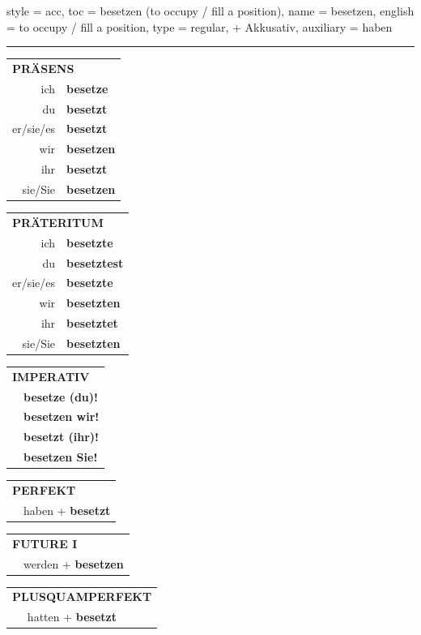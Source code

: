 \begin{verbentry}{
  style = {acc},
  toc = {besetzen (to occupy / fill a position)},
  name = {besetzen},
  english = {to occupy / fill a position},
  type = {regular, + Akkusativ},
  auxiliary = {haben}
}


\vspace{5pt}
\hrule
\vspace{5pt}

\begin{tabular}{rl}
\multicolumn{2}{l}{\textbf{PRÄSENS}}\\
ich & \textbf{besetze}\\
du & \textbf{besetzt}\\
er/sie/es & \textbf{besetzt}\\
wir & \textbf{besetzen}\\
ihr & \textbf{besetzt}\\
sie/Sie & \textbf{besetzen}\\
\end{tabular}
\hfill
\begin{tabular}{rl}
\multicolumn{2}{l}{\textbf{PRÄTERITUM}}\\
ich & \textbf{besetzte}\\
du & \textbf{besetztest}\\
er/sie/es & \textbf{besetzte}\\
wir & \textbf{besetzten}\\
ihr & \textbf{besetztet}\\
sie/Sie & \textbf{besetzten}\\
\end{tabular}
\hfill
\begin{tabular}{rl}
\multicolumn{2}{l}{\textbf{IMPERATIV}}\\
& \textbf{besetze (du)!}\\
& \textbf{besetzen wir!}\\
& \textbf{besetzt (ihr)!}\\
& \textbf{besetzen Sie!}\\
\end{tabular}

\vspace{10pt}

\begin{tabular}{rl}
\multicolumn{2}{l}{\textbf{PERFEKT}}\\
& haben + \textbf{besetzt}\\
\end{tabular}
\hfill
\begin{tabular}{rl}
\multicolumn{2}{l}{\textbf{FUTURE I}}\\
& werden + \textbf{besetzen}\\
\end{tabular}
\hfill
\begin{tabular}{rl}
\multicolumn{2}{l}{\textbf{PLUSQUAMPERFEKT}}\\
& hatten + \textbf{besetzt}\\
\end{tabular}


\end{verbentry}
